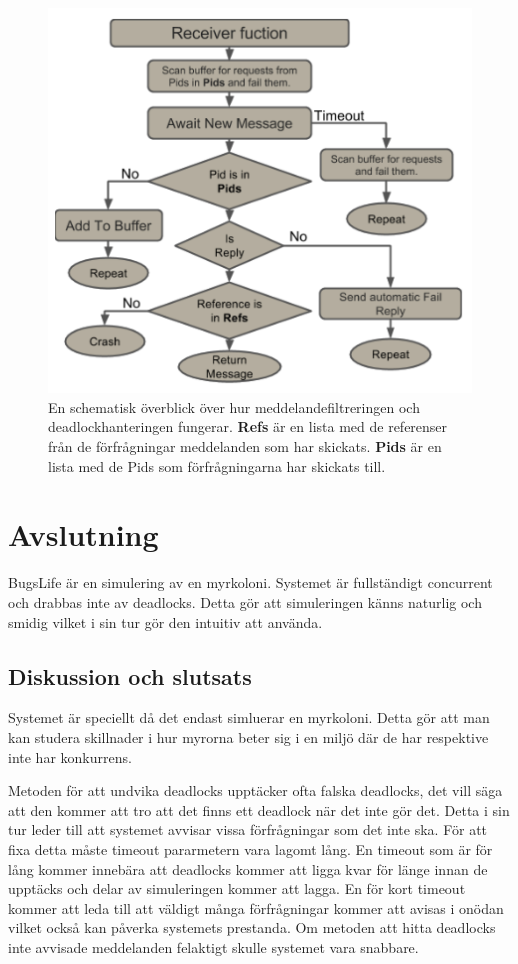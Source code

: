 \documentclass[12pt]{article}
\begin{document}
\begin{figure}[H]
    \centering
    \includegraphics[width=\textwidth]{BugsLife-Fig4.png}
    \caption{
        En schematisk överblick över hur meddelandefiltreringen och deadlockhanteringen fungerar.
        \textbf{Refs} är en lista med de referenser från de förfrågningar meddelanden som har skickats.
        \textbf{Pids} är en lista med de Pids som förfrågningarna har skickats till.
    }\label{fig:deadlock}
\end{figure}

\section{Avslutning}
BugsLife är en simulering av en myrkoloni.
Systemet är fullständigt concurrent och drabbas inte av deadlocks.
Detta gör att simuleringen känns naturlig och smidig vilket i sin tur gör den intuitiv att använda.

\subsection{Diskussion och slutsats}
Systemet är speciellt då det endast simluerar en myrkoloni.
Detta gör att man kan studera skillnader i hur myrorna beter sig i en miljö där de har respektive inte har konkurrens.

Metoden för att undvika deadlocks upptäcker ofta falska deadlocks,
det vill säga att den kommer att tro att det finns ett deadlock när det inte gör det.
Detta i sin tur leder till att systemet avvisar vissa förfrågningar som det inte ska.
För att fixa detta måste timeout pararmetern vara lagomt lång.
En timeout som är för lång kommer innebära att deadlocks kommer att ligga kvar för länge innan de upptäcks och delar av simuleringen kommer att lagga.
En för kort timeout kommer att leda till att väldigt många förfrågningar kommer att avisas i onödan vilket också kan påverka systemets prestanda.
Om metoden att hitta deadlocks inte avvisade meddelanden felaktigt skulle systemet vara snabbare.
\end{document}

